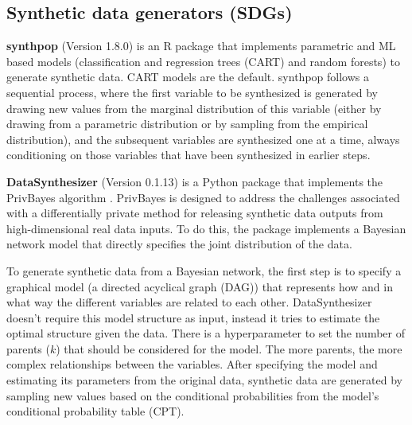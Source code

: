 \documentclass[runningheads]{llncs}
\begin{document}
\subsection{Synthetic data generators (SDGs)}

{\bf synthpop} (Version 1.8.0) \cite{nowok2016synthpop} is an \textsf{R} package that implements parametric and ML based models (classification and regression trees (CART) and random forests) to generate synthetic data. CART models are the default. synthpop follows a sequential process, where the first variable to be synthesized is generated by drawing new values from the marginal distribution of this variable (either by drawing from a parametric distribution or by sampling from the empirical distribution), and the subsequent variables are synthesized one at a time, always conditioning on those variables that have been synthesized in earlier steps. 


{\bf DataSynthesizer} (Version 0.1.13) \cite{ping2017datasynthesizer} is a Python package that implements the PrivBayes algorithm \cite{zhang2017privbayes}.  PrivBayes is designed to address the challenges associated with a differentially private method for releasing synthetic data outputs from high-dimensional real data inputs.  To do this, the package implements a Bayesian network model that directly specifies the joint distribution of the data.  

To generate synthetic data from a Bayesian network, the first step is to specify a graphical model (a directed acyclical graph (DAG)) that represents how and in what way the different variables are related to each other. DataSynthesizer doesn't require this model structure as input, instead it tries to estimate the optimal structure given the data. There is a hyperparameter to set the number of parents ($k$) that should be considered for the model. The more parents, the more complex relationships between the variables. After specifying the model and estimating its parameters from the original data, synthetic data are generated by sampling new values based on the conditional probabilities from the model's conditional probability table (CPT).  
\end{document}
